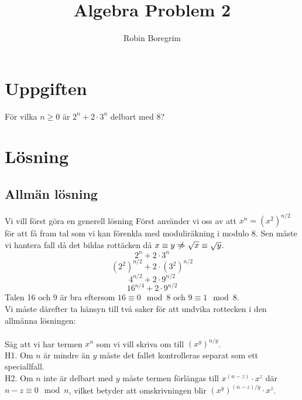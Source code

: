 \documentclass[11pt]{article}
\begin{document}
\title{Algebra Problem 2}
\author{Robin Boregrim}
\maketitle
\renewcommand{\contentsname}{Innehållsförteckning}
\tableofcontents
\newpage

\section{Uppgiften}
För vilka $n \geq 0$ är $2^n + 2 \cdot 3^n$ delbart med $8$?
\section{Lösning}
\subsection{Allmän lösning}
Vi vill först göra en generell lösning
Först använder vi oss av att $x^n = (x^2)^{n/2}$ för att få fram tal som vi kan förenkla med moduliräkning i modulo 8. Sen måste vi hantera fall då det bildas rottäcken då  $x \equiv y \centernot\Rightarrow \sqrt{x} \equiv \sqrt{y}$. \\
\begin{equation} \label{eq:start}
2^n + 2 \cdot 3^n
\end{equation}
$$(2^2)^{n/2} + 2 \cdot (3^2)^{n/2}$$
$$4^{n/2} + 2 \cdot 9^{n/2}$$
\begin{equation} \label{eq:big4}
16^{n/4} + 2 \cdot 9^{n/2}
\end{equation}
Talen 16 och 9 är bra eftersom $16 \equiv 0 \mod 8$ och $9 \equiv 1 \mod 8$.\\
Vi måste därefter ta hänsyn till två saker för att undvika rottecken i den allmänna lösningen:\\\\
Säg att vi har termen $x^{n}$ som vi vill skriva om till $(x^y)^{n/y}$.\\
H1. Om $n$ är mindre än $y$ måste det fallet kontrolleras separat som ett speciallfall.\\
H2. Om $n$ inte är delbart med $y$ måste termen förlängas till $x^{(n-z)} \cdot x^z$ där $n-z \equiv 0 \mod n $, vilket betyder att omskrivningen blir $(x^y)^{(n-z)/y} \cdot x^z $.\\
\end{document}
